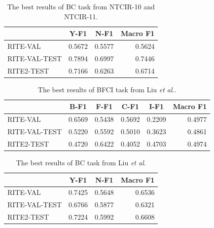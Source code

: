 \documentclass[12pt]{article}
\begin{document}
\begin{CJK*}{UTF8}{bkai}
\begin{spacing}{1.77}
\begin{table}[H]
  \centering
  \setlength{\extrarowheight}{-3pt}
  \begin{tabular}{|l|r|r|r|}
  \hline
   & \multicolumn{1}{c|}{Y-F1} & \multicolumn{1}{c|}{N-F1} & \multicolumn{1}{c|}{Macro F1} \\ \hline
  RITE-VAL & 0.5672 & 0.5577 & 0.5624 \\ \hline
  RITE-VAL-TEST & 0.7894 & 0.6997 & 0.7446 \\ \hline
  RITE2-TEST & 0.7166 & 0.6263 & 0.6714 \\ \hline
  \end{tabular}
  \caption{The best results of BC task from NTCIR-10 and NTCIR-11.}
  \label{result:bc_ntcir}
\end{table}

\begin{table}[H]
  \centering
  \setlength{\extrarowheight}{-3pt}
  \begin{tabular}{|l|r|r|r|r|r|}
  \hline
   & \multicolumn{1}{c|}{B-F1} & \multicolumn{1}{c|}{F-F1} & \multicolumn{1}{c|}{C-F1} & \multicolumn{1}{c|}{I-F1} & \multicolumn{1}{c|}{Macro F1} \\ \hline
  RITE-VAL & 0.6569 & 0.5438 & 0.5692 & 0.2209 & 0.4977 \\ \hline
  RITE-VAL-TEST & 0.5220 & 0.5592 & 0.5010 & 0.3623 & 0.4861 \\ \hline
  RITE2-TEST & 0.4720 & 0.6422 & 0.4052 & 0.4703 & 0.4974 \\ \hline
  \end{tabular}
  \caption{The best results of BFCI task from Liu \emph{et al}..}
  \label{result:bfci_liu_2016}
\end{table}

\begin{table}[H]
  \centering
  \setlength{\extrarowheight}{-3pt}
  \begin{tabular}{|l|r|r|r|}
  \hline
   & \multicolumn{1}{c|}{Y-F1} & \multicolumn{1}{c|}{N-F1} & \multicolumn{1}{c|}{Macro F1} \\ \hline
  RITE-VAL & 0.7425 & 0.5648 & 0.6536 \\ \hline
  RITE-VAL-TEST & 0.6766 & 0.5877 & 0.6321 \\ \hline
  RITE2-TEST & 0.7224 & 0.5992 & 0.6608 \\ \hline
  \end{tabular}
  \caption{The best results of BC task from Liu \emph{et al}.}
  \label{result:bc_liu_2016}
\end{table}


\end{spacing}
\end{CJK*}
\end{document}
